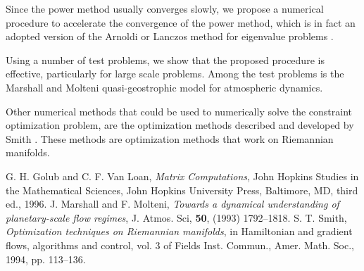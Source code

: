 \documentclass{report}
\begin{document}
Since the power method usually converges slowly, we propose a numerical
procedure to accelerate the convergence of the power method, which is
in fact an adopted version of the Arnoldi or Lanczos method for eigenvalue
problems \cite{golub}.

Using a number of test problems, we show that the proposed procedure is
effective, particularly for large scale problems.
Among the test problems is the Marshall and Molteni quasi-geostrophic model
\cite{molteni} for atmospheric dynamics.

Other numerical methods that could be used to numerically solve the
constraint optimization problem, are the optimization methods described
and developed by Smith \cite{smith}.
These methods are optimization methods that work on Riemannian manifolds.

G. H. Golub and C. F. Van Loan, {\it Matrix Computations}, John Hopkins
Studies in the Mathematical Sciences, John Hopkins University Press,
Baltimore, MD, third ed., 1996.
J. Marshall and F. Molteni, {\it Towards a dynamical understanding of
planetary-scale flow regimes}, J. Atmos. Sci, {\bf 50}, (1993) 1792--1818.
S. T. Smith, {\it Optimization techniques on {R}iemannian manifolds}, in
Hamiltonian and gradient flows, algorithms and control, vol. 3 of Fields
Inst. Commun., Amer. Math. Soc., 1994, pp. 113--136.
\end{document}
